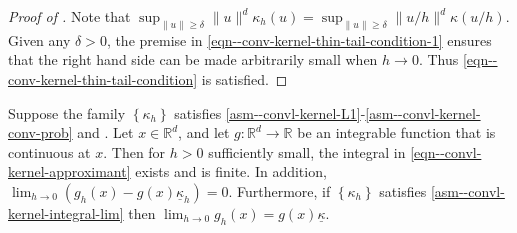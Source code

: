 \begin{proof}[Proof of ]
Note that \(\sup_{\|u\| \geq \delta} \|u\|^{d} \kappa_{h} (u) = \sup_{\|u\| \geq
\delta} \| u / h \|^{d} \kappa (u / h)\).
Given any \(\delta > 0\), the premise in
\eqref{eqn--conv-kernel-thin-tail-condition-1} ensures that the right hand side
can be made arbitrarily small when \(h \to 0\).
Thus \eqref{eqn--conv-kernel-thin-tail-condition} is satisfied.
\end{proof}

\begin{theorem}
\label{thm--convl-kernel-conv-thin-tail}
Suppose the family \(\left\{ \kappa_{h} \right\}\) satisfies
\ref{asm--convl-kernel-L1}-\ref{asm--convl-kernel-conv-prob} and
.
Let \(x \in \mathbb{R}^{d}\), and let \(g : \mathbb{R}^{d} \to \mathbb{R}\) be
an integrable function that is continuous at \(x\).
Then for \(h > 0\) sufficiently small, the integral in
\eqref{eqn--convl-kernel-approximant} exists and is finite.
In addition, \(\lim_{h \to 0} \left( g_{h} (x) - g (x) \underline{\kappa}_{h}
\right) = 0\).
Furthermore, if \(\left\{ \kappa_{h} \right\}\) satisfies
\ref{asm--convl-kernel-integral-lim} then \(\lim_{h \to 0} g_{h} (x) = g (x)
\underline{\kappa}\).
\end{theorem}

